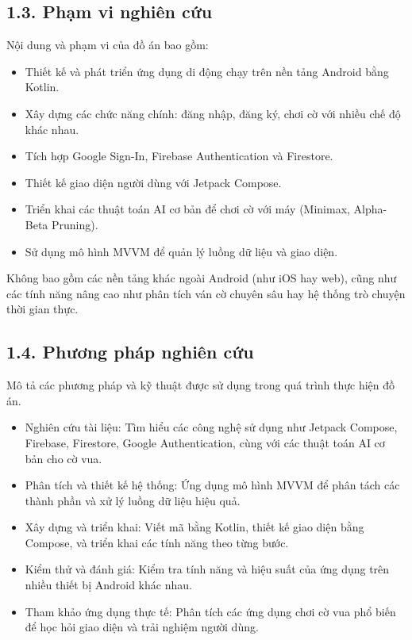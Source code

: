 \documentclass[a4paper,12pt]{article}
\begin{document}
\subsection*{1.3. Phạm vi nghiên cứu}

\justify
\noindent Nội dung và phạm vi của đồ án bao gồm:
\begin{itemize}[label=·]
    \item Thiết kế và phát triển ứng dụng di động chạy trên nền tảng Android bằng Kotlin.
    \item Xây dựng các chức năng chính: đăng nhập, đăng ký, chơi cờ với nhiều chế độ khác nhau.
    \item Tích hợp Google Sign-In, Firebase Authentication và Firestore.
    \item Thiết kế giao diện người dùng với Jetpack Compose.
    \item Triển khai các thuật toán AI cơ bản để chơi cờ với máy (Minimax, Alpha-Beta Pruning).
    \item Sử dụng mô hình MVVM để quản lý luồng dữ liệu và giao diện.
\end{itemize}
\noindent Không bao gồm các nền tảng khác ngoài Android (như iOS hay web), cũng như các tính năng nâng cao như phân tích ván cờ chuyên sâu hay hệ thống trò chuyện thời gian thực.

\subsection*{1.4. Phương pháp nghiên cứu}

\justify
\noindent Mô tả các phương pháp và kỹ thuật được sử dụng trong quá trình thực hiện đồ án.
\begin{itemize}[label=·]
    \item Nghiên cứu tài liệu: Tìm hiểu các công nghệ sử dụng như Jetpack Compose, Firebase, Firestore, Google Authentication, cùng với các thuật toán AI cơ bản cho cờ vua.
    \item Phân tích và thiết kế hệ thống: Ứng dụng mô hình MVVM để phân tách các thành phần và xử lý luồng dữ liệu hiệu quả.
    \item Xây dựng và triển khai: Viết mã bằng Kotlin, thiết kế giao diện bằng Compose, và triển khai các tính năng theo từng bước.
    \item Kiểm thử và đánh giá: Kiểm tra tính năng và hiệu suất của ứng dụng trên nhiều thiết bị Android khác nhau.
    \item Tham khảo ứng dụng thực tế: Phân tích các ứng dụng chơi cờ vua phổ biến để học hỏi giao diện và trải nghiệm người dùng.
\end{itemize}
\end{document}
